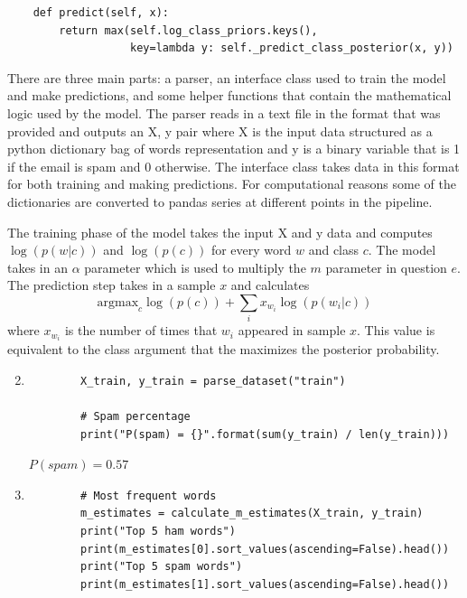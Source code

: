 \begin{enumerate}
\begin{verbatim}
    def predict(self, x):        
        return max(self.log_class_priors.keys(),
                   key=lambda y: self._predict_class_posterior(x, y))

   \end{verbatim}

   There are three main parts: a parser, an interface class used to train the model and make predictions, and some helper functions that contain the mathematical logic used by the model. The parser reads in a text file in the format that was provided and outputs an X, y pair where X is the input data structured as a python dictionary bag of words representation and y is a binary variable that is 1 if the email is spam and 0 otherwise. The interface class takes data in this format for both training and making predictions. For computational reasons some of the dictionaries are converted to pandas series at different points in the pipeline. 

   The training phase of the model takes the input X and y data and computes $\log(p(w|c))$ and $\log(p(c))$ for every word $w$ and class $c$. The model takes in an $\alpha$ parameter which is used to multiply the $m$ parameter in question $e$. The prediction step takes in a sample $x$ and calculates
   \begin{equation}
   	\mbox{argmax}_c \log(p(c)) + \sum_i x_{w_i}\log(p(w_i | c)) 
   \end{equation} 
   where $x_{w_i}$ is the number of times that $w_i$ appeared in sample $x$. This value is equivalent to the class argument that the maximizes the posterior probability.

   \begin{enumerate}
  	\setcounter{enumii}{1}
  	\def\labelenumii{\alph{enumii}.}
  	\item 
  	\begin{verbatim}
	  	X_train, y_train = parse_dataset("train")

		# Spam percentage
		print("P(spam) = {}".format(sum(y_train) / len(y_train)))
	\end{verbatim}

  	$P(spam) = 0.57$
  	\item
  	\begin{verbatim}
		# Most frequent words
		m_estimates = calculate_m_estimates(X_train, y_train)
		print("Top 5 ham words")
		print(m_estimates[0].sort_values(ascending=False).head())
		print("Top 5 spam words")
		print(m_estimates[1].sort_values(ascending=False).head())
	\end{verbatim}


\end{enumerate}
\end{enumerate}
